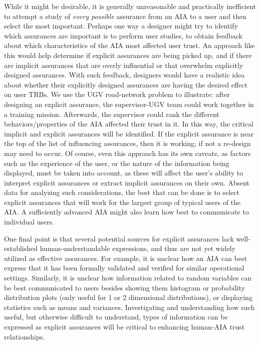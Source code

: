     While it might be desirable, it is generally unreasonable and practically inefficient to attempt a study of \emph{every possible} assurance from an AIA to a user and then select the most important. Perhaps one way a designer might try to identify which assurances are important is to perform user studies, to obtain feedback about which characteristics of the AIA most affected user trust. An approach like this would help determine if explicit assurances are being picked up, and if there are implicit assurances that are overly influential or that overwhelm explicitly designed assurances. With such feedback, designers would have a realistic idea about whether their explicitly designed assurances are having the desired effect on user TRBs. We use the UGV road-network problem to illustrate: after designing an explicit assurance, the supervisor-UGV team could work together in a training mission. Afterwards, the supervisor could rank the different behaviors/properties of the AIA affected their trust in it. In this way, the critical implicit and explicit assurances will be identified. If the explicit assurance is near the top of the list of influencing assurances, then it is working; if not a re-design may need to occur. 
Of course, even this approach has its own caveats, as factors such as the experience of the user, or the nature of the information being displayed, must be taken into account, as these will affect the user's ability to interpret explicit assurances or extract implicit assurances on their own. Absent data for analyzing such considerations, the best that can be done is to select explicit assurances that will work for the largest group of typical users of the AIA. A sufficiently advanced AIA might also learn how best to communicate to individual users. %

One final point is that several potential sources for explicit assurances lack well-established human-understandable expressions, and thus are not yet widely utilized as effective assurances. For example, it is unclear how an AIA can best express that it has been formally validated and verified for similar operational settings. 
Similarly, it is unclear how information related to random variables can be best communicated to users besides showing them histogram or probability distribution plots (only useful for 1 or 2 dimensional distributions), or displaying statistics such as means and variances. 
Investigating and understanding how such useful, but otherwise difficult to understand, types of information can be expressed as explicit assurances will be critical to enhancing human-AIA trust relationships. 

